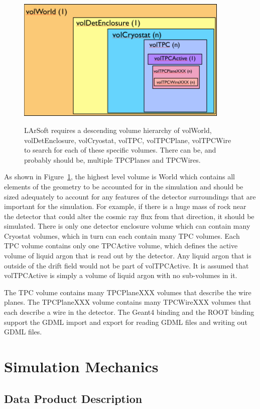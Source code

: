 \documentclass[12pt]{elsarticle}
\begin{document}
\begin{figure}[h]
\center
\caption{LArSoft requires a descending volume hierarchy of volWorld, volDetEnclosure, volCryostat, volTPC, volTPCPlane, volTPCWire to search for each of these specific volumes. There can be, and probably should be, multiple TPCPlanes and TPCWires.}
\includegraphics[width=4.0in]{./imgs/geometry_volumes.png}
\label{geo-vol.img}
\end{figure}

As shown in Figure~\ref{geo-vol.img},
the highest level volume is World which contains all elements of the geometry to be accounted for in the simulation and should be sized adequately to account for any features of the detector surroundings that are important for the simulation. For example, if there is a huge mass of rock near the detector that could alter the cosmic ray flux from that direction, it should be simulated. There is only one detector enclosure volume which can contain many Cryostat volumes, which in turn can each contain many TPC volumes. Each TPC volume contains only one TPCActive volume, which defines the active volume of liquid argon that is read out by the detector. Any liquid argon that is outside of the drift field would not be part of volTPCActive. It is assumed that volTPCActive is simply a volume of liquid argon with no sub-volumes in it. 

The TPC volume contains many TPCPlaneXXX volumes that describe the wire planes. The TPCPlaneXXX volume contains many TPCWireXXX volumes that each describe a wire in the detector. The Geant4 binding and the ROOT binding support the GDML import and export for reading GDML files and writing out GDML files.
                    
\section{Simulation Mechanics}

\subsection{Data Product Description}
\end{document}
